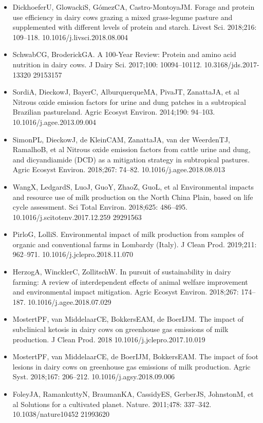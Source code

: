 \documentclass[11pt,a4paper]{article}
\begin{document}
\begin{itemize}
\item DickhoeferU, GlowackiS, GómezCA, Castro-MontoyaJM. Forage and protein use efficiency in dairy cows grazing a mixed grass-legume pasture and supplemented with different levels of protein and starch. Livest Sci. 2018;216: 109–118. 10.1016/j.livsci.2018.08.004
\item SchwabCG, BroderickGA. A 100-Year Review: Protein and amino acid nutrition in dairy cows. J Dairy Sci. 2017;100: 10094–10112. 10.3168/jds.2017-13320 29153157
\item SordiA, DieckowJ, BayerC, AlburquerqueMA, PivaJT, ZanattaJA, et al Nitrous oxide emission factors for urine and dung patches in a subtropical Brazilian pastureland. Agric Ecosyst Environ. 2014;190: 94–103. 10.1016/j.agee.2013.09.004
\item SimonPL, DieckowJ, de KleinCAM, ZanattaJA, van der WeerdenTJ, RamalhoB, et al Nitrous oxide emission factors from cattle urine and dung, and dicyandiamide (DCD) as a mitigation strategy in subtropical pastures. Agric Ecosyst Environ. 2018;267: 74–82. 10.1016/j.agee.2018.08.013
\item WangX, LedgardS, LuoJ, GuoY, ZhaoZ, GuoL, et al Environmental impacts and resource use of milk production on the North China Plain, based on life cycle assessment. Sci Total Environ. 2018;625: 486–495. 10.1016/j.scitotenv.2017.12.259 29291563
\item PirloG, LolliS. Environmental impact of milk production from samples of organic and conventional farms in Lombardy (Italy). J Clean Prod. 2019;211: 962–971. 10.1016/j.jclepro.2018.11.070
\item HerzogA, WincklerC, ZollitschW. In pursuit of sustainability in dairy farming: A review of interdependent effects of animal welfare improvement and environmental impact mitigation. Agric Ecosyst Environ. 2018;267: 174–187. 10.1016/j.agee.2018.07.029
\item MostertPF, van MiddelaarCE, BokkersEAM, de BoerIJM. The impact of subclinical ketosis in dairy cows on greenhouse gas emissions of milk production. J Clean Prod. 2018 10.1016/j.jclepro.2017.10.019
\item MostertPF, van MiddelaarCE, de BoerIJM, BokkersEAM. The impact of foot lesions in dairy cows on greenhouse gas emissions of milk production. Agric Syst. 2018;167: 206–212. 10.1016/j.agsy.2018.09.006
\item FoleyJA, RamankuttyN, BraumanKA, CassidyES, GerberJS, JohnstonM, et al Solutions for a cultivated planet. Nature. 2011;478: 337–342. 10.1038/nature10452 21993620

\end{itemize}
\end{document}
